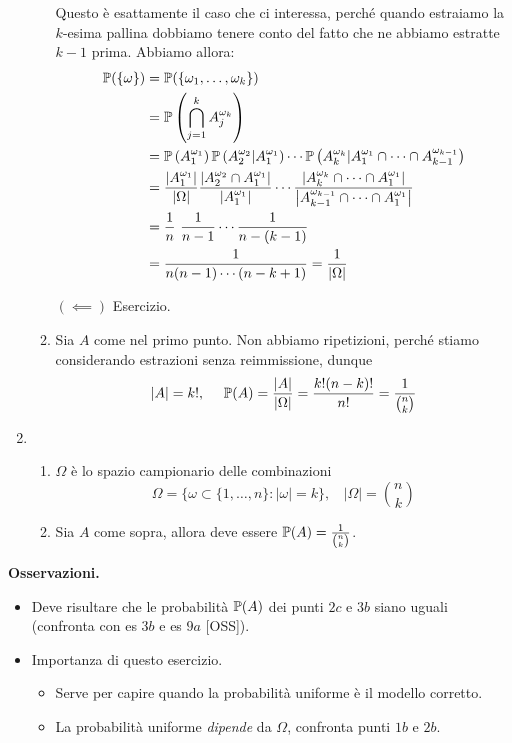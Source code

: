 \begin{enumerate}
\begin{enumerate}
\begin{oss}
Questo è esattamente il caso che ci interessa, perché quando estraiamo la $k$-esima pallina dobbiamo tenere conto del fatto che ne abbiamo estratte $k-1$ prima. Abbiamo allora:\begin{align*}
\mathbb{P}(\{\omega \}) & =\mathbb{P}(\{\omega _{1} ,\dots ,\omega _{k}\})\\
 & =\mathbb{P}\left(\bigcap _{j=1}^{k} A_{j}^{\omega _{k}}\right)\\
 & =\mathbb{P}\left( A_{1}^{\omega _{1}}\right)\mathbb{P}\left( A_{2}^{\omega _{2}} |A_{1}^{\omega _{1}}\right) \cdots \mathbb{P}\left( A_{k}^{\omega _{k}} |A_{1}^{\omega _{1}} \cap \cdots \cap A_{k-1}^{\omega _{k-1}}\right)\\
 & =\frac{\left| A_{1}^{\omega _{1}}\right| }{| \Omega | }\frac{\left| A_{2}^{\omega _{2}} \cap A_{1}^{\omega _{1}}\right| }{\left| A_{1}^{\omega _{1}}\right| } \cdots \frac{| A_{k}^{\omega _{k}} \cap \cdots \cap A_{1}^{\omega _{1}} |}{\left| A_{k-1}^{\omega _{k-1}} \cap \cdots \cap A_{1}^{\omega _{1}}\right| }\\
 & =\frac{1}{n} \ \frac{1}{n-1} \cdots \frac{1}{n-( k-1)}\\
 & =\frac{1}{n( n-1) \cdots ( n-k+1)} =\frac{1}{| \Omega | }
\end{align*}
\end{oss}

$( \impliedby )$ Esercizio.
\item Sia $A$ come nel primo punto. Non abbiamo ripetizioni, perché stiamo considerando estrazioni senza reimmissione, dunque\begin{equation*}
| A| =k!,\ \ \ \ \mathbb{P}( A) =\frac{| A| }{| \Omega | } =\frac{k!( n-k) !}{n!} =\frac{1}{\binom{n}{k}}
\end{equation*}
\end{enumerate}
\item 
\begin{enumerate}
\item $\Omega $ è lo spazio campionario delle combinazioni\begin{equation*}
\Omega =\{\omega \subset \{1,\dots ,n\} :| \omega | =k\} ,\ \ \ \ | \Omega | =\binom{n}{k}
\end{equation*}
\item Sia $A$ come sopra, allora deve essere $\mathbb{P}( A) =\frac{1}{\binom{n}{k}}$.
\end{enumerate}
\end{enumerate}

\textbf{Osservazioni.}
\begin{itemize}
\item Deve risultare che le probabilità $\mathbb{P}( A)$ dei punti $2c$ e $3b$ siano uguali (confronta con es $3b$ e es $9a$ [OSS]).
\item Importanza di questo esercizio.
\begin{itemize}
\item Serve per capire quando la probabilità uniforme è il modello corretto.
\item La probabilità uniforme \textit{dipende} da $\Omega $, confronta punti $1b$ e $2b$.
\end{itemize}
\end{itemize}

